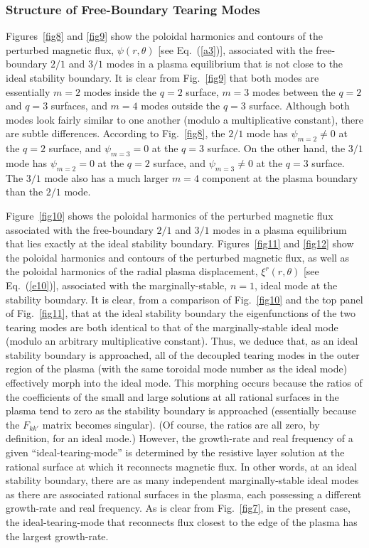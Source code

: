 \documentclass[12pt,prb,aps]{revtex4-1}
\begin{document}
\subsubsection{Structure of Free-Boundary Tearing Modes}
Figures~\ref{fig8} and \ref{fig9} show the poloidal harmonics and contours of the perturbed magnetic flux, $\psi(r,\theta)$ [see Eq.~(\ref{a3})], associated
with the free-boundary  $2/1$ and $3/1$ modes in a  plasma equilibrium that is not close to the ideal stability boundary. It is clear from Fig.~\ref{fig9} that both modes are essentially $m=2$ modes inside the $q=2$ surface, $m=3$ modes between
the $q=2$ and $q=3$ surfaces, and $m=4$ modes outside the $q=3$ surface. Although both modes look fairly similar to
one another (modulo a multiplicative constant), there are subtle differences. 
According to Fig.~\ref{fig8}, the $2/1$ mode  has $\psi_{m=2}\neq 0$ at the $q=2$ surface, and $\psi_{m=3}=0$ at the $q=3$ surface.
On the other hand, the $3/1$ mode  has $\psi_{m=2}= 0$ at the $q=2$ surface, and $\psi_{m=3}\neq 0$ at the $q=3$  surface. The  $3/1$ mode also has a much larger $m=4$ component at the plasma boundary than the $2/1$ mode. 

Figure~\ref{fig10} shows the poloidal harmonics of the perturbed magnetic flux associated
with the free-boundary $2/1$ and $3/1$ modes in a  plasma equilibrium 
that lies exactly at the ideal stability boundary. Figures~\ref{fig11} and \ref{fig12} show the poloidal harmonics and contours of the perturbed magnetic flux, as well
as the poloidal harmonics of the radial
plasma displacement, $\xi^r(r,\theta)$ [see Eq.~(\ref{e10})], associated with the marginally-stable, $n=1$, ideal mode at the stability boundary. It is
clear, from a comparison of Fig.~\ref{fig10} and the top panel of Fig.~\ref{fig11}, that at the ideal stability boundary the eigenfunctions of the two
tearing modes are both  identical to that of the marginally-stable ideal mode (modulo an arbitrary multiplicative constant). Thus, we deduce that, as
an ideal stability boundary is approached, all of the decoupled tearing modes in the outer region of the plasma (with the same toroidal mode number as the ideal mode)
effectively morph into the ideal mode. This morphing occurs because the ratios of the coefficients of the small and large solutions at all rational surfaces in the plasma tend to
zero as the stability boundary is approached (essentially because the $F_{kk'}$ matrix becomes singular). (Of course, the ratios are all zero, by definition, for an ideal mode.) However, the growth-rate and real frequency of a given ``ideal-tearing-mode'' is determined by the 
resistive layer solution at the rational surface at which it reconnects magnetic flux. In other words, at an ideal stability boundary, there are as
many independent marginally-stable ideal modes as there are associated rational surfaces in the plasma, each possessing a different growth-rate and
real frequency. As is clear from Fig.~\ref{fig7}, in the present case, the ideal-tearing-mode that reconnects flux closest to the edge of the plasma has the largest growth-rate. 
\end{document}
